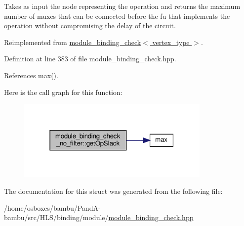 Takes as input the node representing the operation and returns the maximum number of muxes that can be connected before the fu that implements the operation without compromising the delay of the circuit. 



Reimplemented from \hyperlink{structmodule__binding__check_a646dd22cb75e1b178f4291587d628721}{module\+\_\+binding\+\_\+check$<$ vertex\+\_\+type $>$}.



Definition at line 383 of file module\+\_\+binding\+\_\+check.\+hpp.



References max().

Here is the call graph for this function\+:
\nopagebreak
\begin{figure}[H]
\begin{center}
\leavevmode
\includegraphics[width=267pt]{da/dff/structmodule__binding__check__no__filter_a13a56954ea41ba112ee9d4ad3f709ed8_cgraph}
\end{center}
\end{figure}


The documentation for this struct was generated from the following file\+:\begin{DoxyCompactItemize}
\item 
/home/osboxes/bambu/\+Pand\+A-\/bambu/src/\+H\+L\+S/binding/module/\hyperlink{module__binding__check_8hpp}{module\+\_\+binding\+\_\+check.\+hpp}\end{DoxyCompactItemize}
